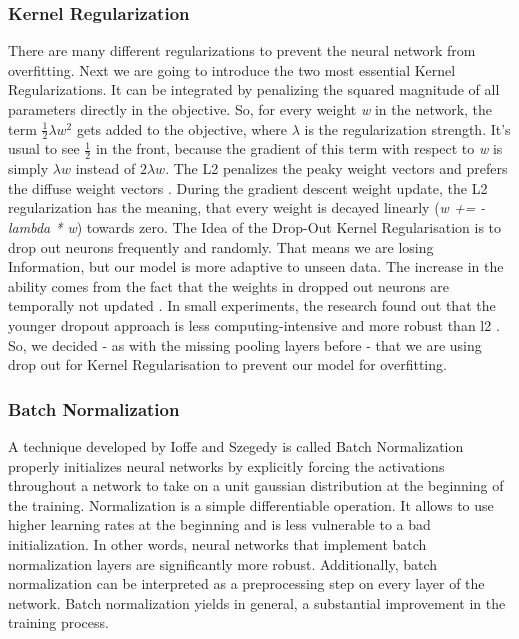 \documentclass[journal]{IEEEtran}
\begin{document}
\subsubsection{Kernel Regularization}
\noindent There are many different regularizations to prevent the neural network from overfitting. Next we are going to introduce the two most essential Kernel Regularizations. It can be integrated by penalizing the squared magnitude of all parameters directly in the objective. So, for every weight \textit{w} in the network, the term \(\frac{1}{2} \lambda w^2\) gets added to the objective, where \(\lambda \) is the regularization strength. It's usual to see \(\frac{1}{2}\) in the front, because the gradient of this term with respect to \textit{w} is simply \(\lambda w\) instead of \(2 \lambda w\). The L2 penalizes the peaky weight vectors and prefers the diffuse weight vectors \cite{RN4}. During the gradient descent weight update, the L2 regularization has the meaning, that every weight is decayed linearly (\textit{w += -lambda * w}) towards zero. The Idea of the Drop-Out Kernel Regularisation is to drop out neurons frequently and randomly. That means we are losing Information, but our model is more adaptive to unseen data. The increase in the ability comes from the fact that the weights in dropped out neurons are temporally not updated \cite{Dropout}. In small experiments, the research found out that the younger dropout approach is less computing-intensive and more robust than l2 \cite{dropoutVsL2}. So, we decided - as with the missing pooling layers before - that we are using drop out for Kernel Regularisation to prevent our model for overfitting. \\
\subsubsection{Batch Normalization}
\noindent A technique developed by Ioffe and Szegedy \cite{RN4} is called Batch Normalization properly initializes neural networks by explicitly forcing the activations throughout a network to take on a unit gaussian distribution at the beginning of the training. Normalization is a simple differentiable operation. 
It allows to use higher learning rates at the beginning and is less vulnerable to a bad initialization. In other words, neural networks that implement batch normalization layers are significantly more robust. Additionally, batch normalization can be interpreted as a preprocessing step on every layer of the network. Batch normalization yields in general, a substantial improvement in the training process. \\
\end{document}
